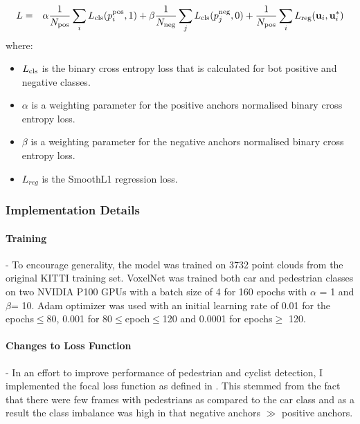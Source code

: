 \begin{eqnarray}
	 L & = & \alpha\frac{1}{N_{\text{\scriptsize pos}}} \sum\limits_{i} L_{\text{\scriptsize cls}}(p^{\text{\scriptsize pos}}_i, 1) + 
	\beta\frac{1}{N_{\text{\scriptsize neg}}} \sum\limits_{j} L_{\text{\scriptsize cls}}(p^{\text{\scriptsize neg}}_j, 0) \nonumber  + \frac{1}{N_{\text{\scriptsize pos}}} \sum\limits_{i} L_{\text{\scriptsize reg}}(\mathbf{u}_i, \mathbf{u}_i^*)	
	\label{eqn}
\end{eqnarray}
where:
\begin{itemize}[noitemsep]
	\item $L_{\text{\scriptsize cls}}$ is the binary cross entropy loss that is calculated for bot positive and negative classes. 
	\item $\alpha$ is a weighting parameter for the positive anchors normalised binary cross entropy loss. 
	\item $\beta$ is a weighting parameter for the negative anchors normalised binary cross entropy loss.
	\item $L_{reg}$ is the SmoothL1 regression loss.
\end{itemize}

\subsubsection{Implementation Details}
\paragraph{Training} - 
To encourage generality, the model was trained on 3732 point clouds from the original KITTI training set.
VoxelNet was trained both car and pedestrian classes on two NVIDIA P100 GPUs with a batch size of 4 for 160 epochs  with $\alpha$ = 1 and  $\beta$= 10. Adam optimizer was used with an initial learning rate of 0.01 for the epochs$\le$80, 0.001 for 80$\le$epoch$\le$120 and 0.0001 for epochs$\ge$ 120. 


\paragraph{Changes to Loss Function } - 
In an effort to improve performance of pedestrian and cyclist detection, I implemented the focal loss function as defined in \cite{lin2018focal}. This stemmed from the fact that there were few frames with pedestrians as compared to the car class and as a result the class imbalance was high in that negative anchors $\gg$ positive anchors. 


